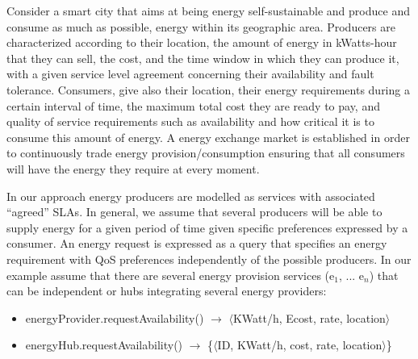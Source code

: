 Consider a smart city that aims at being energy self-sustainable and produce and consume as much as possible, energy within its geographic area. 
Producers are characterized according to their location, the amount of energy in kWatts-hour that they can sell, the cost, and the time window in which they can produce it, with a given service level agreement concerning their availability and fault tolerance. 
Consumers, give also their location, their energy requirements during a certain interval of time, the maximum total cost they are ready to pay, and quality of service requirements such as availability and how critical it is to consume this amount of energy. 
A energy exchange market is established in order to continuously trade  energy provision/consumption ensuring that all consumers will have the energy they require at every moment.



In our approach energy producers are modelled as services with associated ``agreed'' SLAs. 
In general, we assume that several producers will be able to supply energy for a given period of time given specific  preferences expressed by a consumer. 
An energy request is expressed as a query that specifies an energy requirement with QoS preferences independently of the possible producers. In our example assume that there are several energy provision services ({\sf e$_1$, ... e$_n$}) that can be independent or hubs integrating several energy providers:
\begin{itemize}
\sf\footnotesize
\item energyProvider.requestAvailability() $\rightarrow$ $\langle$KWatt/h, Ecost, rate, location$\rangle$

\item energyHub.requestAvailability() $\rightarrow$  \{$\langle$ID, KWatt/h, cost, rate, location$\rangle$\}

\end{itemize}

